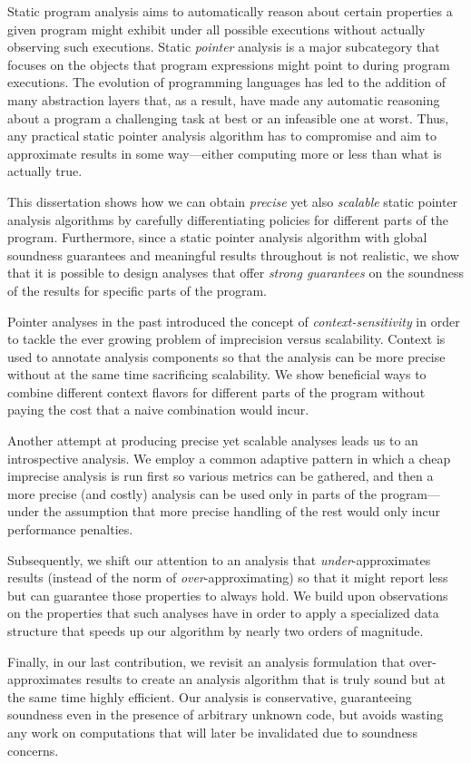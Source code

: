 Static program analysis aims to automatically reason about certain properties a given program might exhibit under all possible executions without actually observing such executions. Static \emph{pointer} analysis is a major subcategory that focuses on the objects that program expressions might point to during program executions. The evolution of programming languages has led to the addition of many abstraction layers that, as a result, have made any automatic reasoning about a program a challenging task at best or an infeasible one at worst. Thus, any practical static pointer analysis algorithm has to compromise and aim to approximate results in some way---either computing more or less than what is actually true.

This dissertation shows how we can obtain \emph{precise} yet also \emph{scalable} static pointer analysis algorithms by carefully differentiating policies for different parts of the program. Furthermore, since a static pointer analysis algorithm with global soundness guarantees and meaningful results throughout is not realistic, we show that it is possible to design analyses that offer \emph{strong guarantees} on the soundness of the results for specific parts of the program.

Pointer analyses in the past introduced the concept of \emph{context-sensitivity} in order to tackle the ever growing problem of imprecision versus scalability. Context is used to annotate analysis components so that the analysis can be more precise without at the same time sacrificing scalability. We show beneficial ways to combine different context flavors for different parts of the program without paying the cost that a naive combination would incur.

Another attempt at producing precise yet scalable analyses leads us to an introspective analysis. We employ a common adaptive pattern in which a cheap imprecise analysis is run first so various metrics can be gathered, and then a more precise (and costly) analysis can be used only in parts of the program---under the assumption that more precise handling of the rest would only incur performance penalties.

Subsequently, we shift our attention to an analysis that \emph{under}-approximates results (instead of the norm of \emph{over}-approximating) so that it might report less but can guarantee those properties to always hold. We build upon observations on the properties that such analyses have in order to apply a specialized data structure that speeds up our algorithm by nearly two orders of magnitude.

Finally, in our last contribution, we revisit an analysis formulation that over-approximates results to create an analysis algorithm that is truly sound but at the same time highly efficient. Our analysis is conservative, guaranteeing soundness even in the presence of arbitrary unknown code, but avoids wasting any work on computations that will later be invalidated due to soundness concerns.